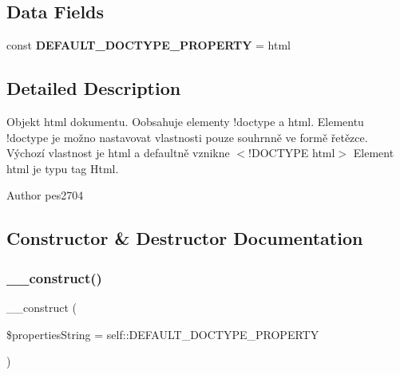 \subsection*{Data Fields}
\begin{DoxyCompactItemize}
\item 
\mbox{\label{class_pes_1_1_document_1_1_html_document_a16a6c633e014fc55acb7e6ecaf1a27c6}} 
const {\bfseries D\+E\+F\+A\+U\+L\+T\+\_\+\+D\+O\+C\+T\+Y\+P\+E\+\_\+\+P\+R\+O\+P\+E\+R\+TY} = \textquotesingle{}html\textquotesingle{}
\end{DoxyCompactItemize}


\subsection{Detailed Description}
Objekt html dokumentu. Oobsahuje elementy !doctype a html. Elementu !doctype je možno nastavovat vlastnosti pouze souhrnně ve formě řetězce. Výchozí vlastnost je \textquotesingle{}html\textquotesingle{} a defaultně vznikne $<$!\+D\+O\+C\+T\+Y\+PE html$>$ Element html je typu tag Html.

\begin{DoxyAuthor}{Author}
pes2704 
\end{DoxyAuthor}


\subsection{Constructor \& Destructor Documentation}
\mbox{\label{class_pes_1_1_document_1_1_html_document_a70b3d346ee887e5e64cfb9589f0a4130}} 
\subsubsection{\texorpdfstring{\+\_\+\+\_\+construct()}{\_\_construct()}}
{\footnotesize\ttfamily \+\_\+\+\_\+construct (\begin{DoxyParamCaption}\item[{}]{\$properties\+String = {\ttfamily self\+:\+:DEFAULT\+\_\+DOCTYPE\+\_\+PROPERTY} }\end{DoxyParamCaption})}


